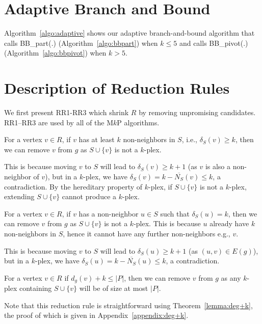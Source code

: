 \documentclass[sigconf, nonacm]{acmart}
\begin{document}
\section{Adaptive Branch and Bound}\label{bb5}

Algorithm~\ref{algo:adaptive} shows our adaptive branch-and-bound algorithm that calls BB\_part(.) (Algorithm~\ref{algo:bbpart}) when $k\leq 5$ and calls BB\_pivot(.) (Algorithm~\ref{algo:bbpivot}) when $k>5$.

\section{Description of Reduction Rules}\label{appendix:reduce}
We first present RR1-RR3 which shrink $R$ by removing unpromising candidates. RR1--RR3 are used by all of the M$k$P algorithms.

\vspace{1mm}
 For a vertex $v\in R$, if $v$ has at least $k$ non-neighbors in $S$, i.e., $\delta_S(v)\ge k$, then we can remove $v$ from $g$ as $S\cup\{v\}$ is not a $k$-plex.

\vspace{1mm}
This is because moving $v$ to $S$ will lead to $\delta_S(v)\ge k+1$ (as $v$ is also a non-neighbor of $v$), but in a $k$-plex, we have $\delta_S(v)=k-\overline{N_S}(v)\leq k$, a contradiction. By the hereditary property of $k$-plex, if $S\cup\{v\}$ is not a $k$-plex, extending $S\cup\{v\}$ cannot produce a $k$-plex.

\vspace{1mm}
 For a vertex $v\in R$, if $v$ has a non-neighbor $u\in S$ such that $\delta_S(u)=k$, then we can remove $v$ from $g$ as $S\cup\{v\}$ is not a $k$-plex. This is because $u$ already have $k$ non-neighbors in $S$, hence it cannot have any further non-neighbors e.g., $v$. 

\vspace{1mm}
This is because moving $v$ to $S$ will lead to $\delta_S(u)\ge k+1$ (as $(u, v)\in E(g)$), but in a $k$-plex, we have $\delta_S(u)=k-\overline{N_S}(u)\leq k$, a contradiction.

\vspace{1mm}
 For a vertex $v\in R$ if $d_g(v)+k\le |P|$, then we can remove $v$ from $g$ as any $k$-plex containing $S\cup\{v\}$ will be of size at most $|P|$.

\vspace{1mm}
Note that this reduction rule is straightforward using Theorem~\ref{lemma:deg+k}, the proof of which is given in Appendix~\ref{appendix:deg+k}. 
\end{document}
